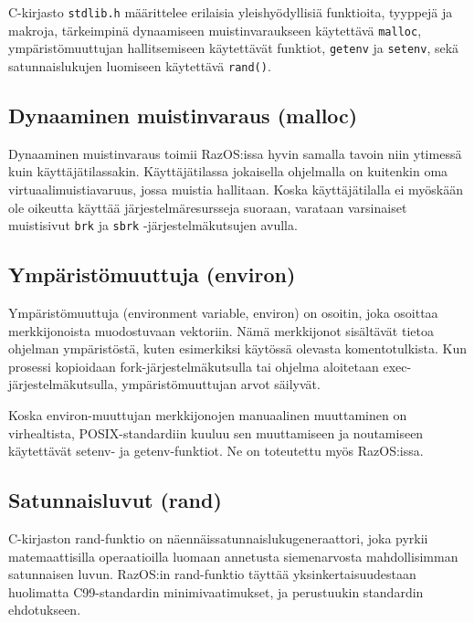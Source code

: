 C-kirjasto \texttt{stdlib.h} määrittelee erilaisia yleishyödyllisiä funktioita, tyyppejä ja makroja, tärkeimpinä dynaamiseen muistinvaraukseen käytettävä \texttt{malloc}, ympäristömuuttujan hallitsemiseen käytettävät funktiot, \texttt{getenv} ja \texttt{setenv}, sekä satunnaislukujen luomiseen käytettävä \texttt{rand()}.

\subsection{Dynaaminen muistinvaraus (malloc)}

Dynaaminen muistinvaraus toimii RazOS:issa hyvin samalla tavoin niin ytimessä kuin käyttäjätilassakin. Käyttäjätilassa jokaisella ohjelmalla on kuitenkin oma virtuaalimuistiavaruus, jossa muistia hallitaan. Koska käyttäjätilalla ei myöskään ole oikeutta käyttää järjestelmäresursseja suoraan, varataan varsinaiset muistisivut \texttt{brk} ja \texttt{sbrk} -järjestelmäkutsujen avulla.

\subsection{Ympäristömuuttuja (environ)}

Ympäristömuuttuja (environment variable, environ) on osoitin, joka osoittaa merkkijonoista muodostuvaan vektoriin. Nämä merkkijonot sisältävät tietoa ohjelman ympäristöstä, kuten esimerkiksi käytössä olevasta komentotulkista. Kun prosessi kopioidaan fork-järjestelmäkutsulla tai ohjelma aloitetaan exec-järjestelmäkutsulla, ympäristömuuttujan arvot säilyvät.

\par

Koska environ-muuttujan merkkijonojen manuaalinen muuttaminen on virhealtista, POSIX-standardiin kuuluu sen muuttamiseen ja noutamiseen käytettävät setenv- ja getenv-funktiot. Ne on toteutettu myös RazOS:issa.

\subsection{Satunnaisluvut (rand)}

C-kirjaston rand-funktio on näennäissatunnaislukugeneraattori, joka pyrkii matemaattisilla operaatioilla luomaan annetusta siemenarvosta mahdollisimman satunnaisen luvun. RazOS:in rand-funktio täyttää yksinkertaisuudestaan huolimatta C99-standardin minimivaatimukset, ja perustuukin standardin ehdotukseen.

